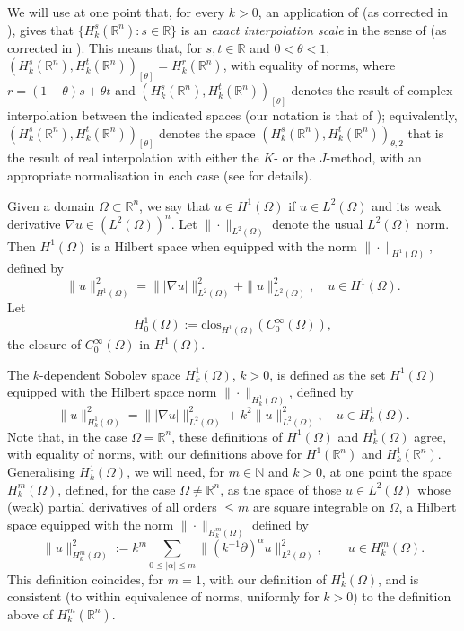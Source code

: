\documentclass{birkjour}
\theoremstyle{definition}
\theoremstyle{remark}
\numberwithin{equation}{section}
\newcommand{\R}{\mathbb{R}}
\newcommand{\N}{\mathbb{N}}
\begin{document}
We will use at one point that, for every $k>0$, an application of \cite[Cor.~3.2]{chandler2015interpolation} (as corrected in \cite{ChHeMo:22}), gives that $\{H_k^s(\R^n):s\in \R\}$ is an {\em exact interpolation scale} in the sense of \cite[Rem.~3.8]{chandler2015interpolation} (as corrected in \cite{ChHeMo:22}). This means that, for $s,t\in \R$ and $0<\theta<1$, $(H_k^s(\R^n), H_k^t(\R^n))_{[\theta]} = H_k^r(\R^n)$, with equality of norms, where  $r = (1 - \theta)s + \theta t$ and $(H_k^s(\R^n), H_k^t(\R^n))_{[\theta]}$ denotes the result of complex interpolation between the indicated spaces (our notation is that of \cite{Bergh:76}); equivalently, $(H_k^s(\R^n), H_k^t(\R^n))_{[\theta]}$ denotes the space $(H_k^s(\R^n), H_k^t(\R^n))_{\theta,2}$ that is the result of real interpolation with either the $K$- or the $J$-method, with an appropriate normalisation in each case (see \cite{chandler2015interpolation,ChHeMo:22} for details).

Given a domain $\Omega\subset\mathbb{R}^n$, we say that $u\in H^1(\Omega)$ if $u\in L^2(\Omega)$ and its weak derivative $\nabla u\in (L^2(\Omega))^n$. Let $\|\cdot\|_{L^2(\Omega)}$ denote the usual $L^2(\Omega)$ norm. Then $H^1(\Omega)$ is a Hilbert space when equipped with the norm $\|\cdot\|_{H^1(\Omega)}$, defined by
\begin{equation*}
\|u\|^2_{H^1(\Omega)}=\| |\nabla u| \|^2_{L^2(\Omega)}+\| u\|^2_{L^2(\Omega)}, \quad u\in H^1(\Omega).
\end{equation*}
Let
 $$
 H_0^1(\Omega) := \text{clos}_{H^1(\Omega)}(C^{\infty}_0(\Omega)),
 $$
 the closure of $C_0^\infty(\Omega)$ in $H^1(\Omega)$.
 
The $k$-dependent Sobolev space $H_k^1(\Omega)$, $k>0$, is defined as the set $H^1(\Omega)$ equipped with the Hilbert space norm $\|\cdot\|_{H_k^1(\Omega)}$, defined by   
\begin{equation*}
\|u\|^2_{H_k^1(\Omega)}=\| |\nabla u| \|^2_{L^2(\Omega)}+k^2\| u\|^2_{L^2(\Omega)}, \quad u\in H_k^1(\Omega).
\end{equation*}
Note that, in the case $\Omega=\R^n$, these definitions of $H^1(\Omega)$ and $H^1_k(\Omega)$ agree, with equality of norms, with our definitions above for $H^1(\R^n)$ and $H^1_k(\R^n)$.  
Generalising $H_k^1(\Omega)$, we will need, for $m\in \N$ and $k>0$,  at one point the space $H_k^m(\Omega)$, defined, for the case $\Omega\neq \R^n$, as the space of those $u\in L^2(\Omega)$ whose (weak) partial derivatives of all orders $\leq m$ are square integrable on $\Omega$, a Hilbert space equipped with the norm $\|\cdot\|_{H_k^m(\Omega)}$ defined by
$$
\|u\|^2_{H_k^m(\Omega)} := k^m\sum_{0\leq |\alpha|\leq m}\|(k^{-1}\partial)^\alpha u\|^2_{L^2(\Omega)}, \qquad u\in H_k^m(\Omega).
$$
This definition coincides, for $m=1$, with our definition of $H_k^1(\Omega)$, and is consistent (to within equivalence of norms, uniformly for $k>0$) to the definition above of $H^m_k(\R^n)$.
 
\end{document}

